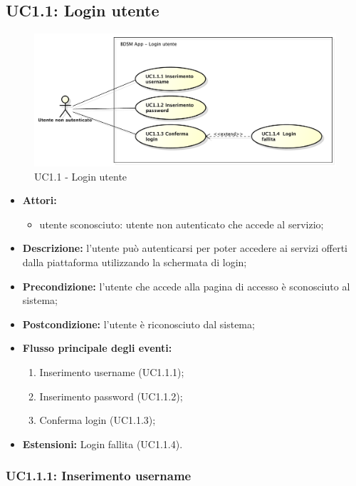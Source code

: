 \pagebreak

\subsection{UC1.1: Login utente}

\begin{figure}[htbp]
    \centering
    \centerline{\includegraphics[scale=0.45]{./images/UC1_1.pdf}}
    \caption{UC1.1 - Login utente}
\end{figure}

\begin{itemize}
    \item \textbf{Attori:}
    \begin{itemize}
        \item utente sconosciuto: utente non autenticato che accede al servizio;
    \end{itemize}
    \item \textbf{Descrizione:} l'utente può autenticarsi per poter accedere ai servizi offerti dalla piattaforma utilizzando la schermata di login;
    \item \textbf{Precondizione:} l'utente che accede alla pagina di accesso è sconosciuto al sistema;
    \item \textbf{Postcondizione:} l'utente è riconosciuto dal sistema;
    \item \textbf{Flusso principale degli eventi:}
    \begin{enumerate}
        \item Inserimento username (UC1.1.1);
        \item Inserimento password (UC1.1.2);
        \item Conferma login (UC1.1.3);
    \end{enumerate}
    \item \textbf{Estensioni:} Login fallita (UC1.1.4).
\end{itemize}


\subsubsection{UC1.1.1: Inserimento username}

